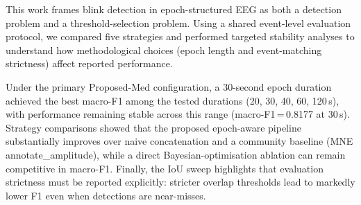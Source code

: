 
This work frames blink detection in epoch-structured EEG as both a detection problem and a
threshold-selection problem. Using a shared event-level evaluation protocol, we compared
five strategies and performed targeted stability analyses to understand how methodological
choices (epoch length and event-matching strictness) affect reported performance.

Under the primary Proposed-Med configuration, a 30-second epoch duration achieved the best
macro-F1 among the tested durations (20, 30, 40, 60, 120\,s), with performance remaining
stable across this range (macro-F1\,=\,0.8177 at 30\,s). Strategy comparisons showed
that the proposed epoch-aware pipeline substantially improves over naive concatenation and
a community baseline (MNE annotate\_amplitude), while a direct Bayesian-optimisation
ablation can remain competitive in macro-F1. Finally, the IoU sweep highlights that
evaluation strictness must be reported explicitly: stricter overlap thresholds lead to
markedly lower F1 even when detections are near-misses.